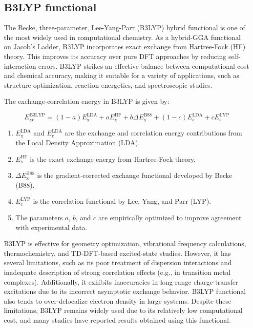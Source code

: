 \subsection{B3LYP functional}

The Becke, three-parameter, Lee-Yang-Parr (B3LYP) hybrid functional is one of the most widely used in computational chemistry. As a hybrid-GGA functional on Jacob’s Ladder, B3LYP incorporates exact exchange from Hartree-Fock (HF) theory. This improves its accuracy over pure DFT approaches by reducing self-interaction errors. B3LYP strikes an effective balance between computational cost and chemical accuracy, making it suitable for a variety of applications, such as structure optimization, reaction energetics, and spectroscopic studies. 

The exchange-correlation energy in B3LYP is given by:

\begin{equation}
    E_{\text{xc}}^{\text{B3LYP}} = (1 - a) E_{\text{x}}^{\text{LDA}} + a E_{\text{x}}^{\text{HF}} + b \Delta E_{\text{x}}^{\text{B88}} + (1 - c) E_{\text{c}}^{\text{LDA}} + c E_{\text{c}}^{\text{LYP}}
\end{equation}

\begin{enumerate}
    \item $E_{\text{x}}^{\text{LDA}}$ and $E_{\text{c}}^{\text{LDA}}$ are the exchange and correlation energy contributions from the Local Density Approximation (LDA).
    \item $E_{\text{x}}^{\text{HF}}$ is the exact exchange energy from Hartree-Fock theory.
    \item $\Delta E_{\text{x}}^{\text{B88}}$ is the gradient-corrected exchange functional developed by Becke (B88).
    \item $E_{\text{c}}^{\text{LYP}}$ is the correlation functional by Lee, Yang, and Parr (LYP).
    \item The parameters $a$, $b$, and $c$ are empirically optimized to improve agreement with experimental data.
\end{enumerate}

B3LYP is effective for geometry optimization, vibrational frequency calculations, thermochemistry, and TD-DFT-based excited-state studies. However, it has several limitations, such as its poor treatment of dispersion interactions and inadequate description of strong correlation effects (e.g., in transition metal complexes). Additionally, it exhibits inaccuracies in long-range charge-transfer excitations due to its incorrect asymptotic exchange behavior. B3LYP functional also tends to over-delocalize electron density in large systems. Despite these limitations, B3LYP remains widely used due to its relatively low computational cost, and many studies have reported results obtained using this functional. 


